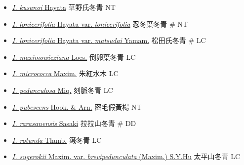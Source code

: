 \begin{itemize}
\begin{itemize}
        \item[] \href{http://www.theplantlist.org/tpl1.1/search?q=Ilex+kusanoi}{\textit{I. kusanoi} Hayata}   草野氏冬青   NT
        \item[] \href{http://www.theplantlist.org/tpl1.1/search?q=Ilex+lonicerifolia+var.+lonicerifolia}{\textit{I. lonicerifolia} Hayata var. \textit{lonicerifolia}}   忍冬葉冬青  \# NT
        \item[] \href{http://www.theplantlist.org/tpl1.1/search?q=Ilex+lonicerifolia+var.+matsudai}{\textit{I. lonicerifolia} Hayata var. \textit{matsudai} Yamam.}   松田氏冬青  \# LC
        \item[] \href{http://www.theplantlist.org/tpl1.1/search?q=Ilex+maximowicziana}{\textit{I. maximowicziana} Loes.}   倒卵葉冬青   LC
        \item[] \href{http://www.theplantlist.org/tpl1.1/search?q=Ilex+micrococca}{\textit{I. micrococca} Maxim.}   朱紅水木   LC
        \item[] \href{http://www.theplantlist.org/tpl1.1/search?q=Ilex+pedunculosa}{\textit{I. pedunculosa} Miq.}   刻脈冬青   LC
        \item[] \href{http://www.theplantlist.org/tpl1.1/search?q=Ilex+pubescens}{\textit{I. pubescens} Hook. \& Arn.}   密毛假黃楊   NT
        \item[] \href{http://www.theplantlist.org/tpl1.1/search?q=Ilex+rarasanensis}{\textit{I. rarasanensis} Sasaki}   拉拉山冬青  \# DD
        \item[] \href{http://www.theplantlist.org/tpl1.1/search?q=Ilex+rotunda}{\textit{I. rotunda} Thunb.}   鐵冬青   LC
        \item[] \href{http://www.theplantlist.org/tpl1.1/search?q=Ilex+sugerokii+var.+brevipedunculata}{\textit{I. sugerokii} Maxim. var. \textit{brevipedunculata} (Maxim.) S.Y.Hu}   太平山冬青   LC

\end{itemize}
\end{itemize}

